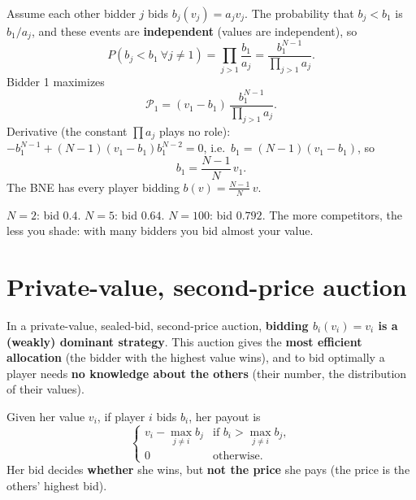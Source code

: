 \documentclass[11pt,a4paper,openany]{book}
\begin{document}
\begin{propbox}[title={$N$ bidders, values uniform on $[0,1]$}]
Assume each other bidder $j$ bids $b_j(v_j) = a_j v_j$. The probability that $b_j < b_1$ is
$b_1/a_j$, and these events are \textbf{independent} (values are independent), so
\[
P(b_j < b_1 \ \forall j \neq 1) = \prod_{j>1} \frac{b_1}{a_j}
  = \frac{b_1^{N-1}}{\prod_{j>1} a_j}.
\]
Bidder 1 maximizes
\[
\mathcal{P}_1 = (v_1 - b_1)\,\frac{b_1^{N-1}}{\prod_{j>1} a_j}.
\]
Derivative (the constant $\prod a_j$ plays no role):
$-b_1^{N-1} + (N-1)(v_1 - b_1) b_1^{N-2} = 0$, i.e.\ $b_1 = (N-1)(v_1 - b_1)$, so
\[
b_1 = \frac{N-1}{N}\, v_1.
\]
The BNE has every player bidding $b(v) = \frac{N-1}{N}\, v$.
\end{propbox}

\begin{exbox}[title={Numbers (not on the slides): value $v = 0.8$}]
$N = 2$: bid $0.4$. $N = 5$: bid $0.64$. $N = 100$: bid $0.792$. The more competitors, the
less you shade: with many bidders you bid almost your value.
\end{exbox}


\section{Private-value, second-price auction}

\begin{thmbox}[title=Truthful bidding is dominant]
In a private-value, sealed-bid, second-price auction, \textbf{bidding $b_i(v_i) = v_i$ is a
(weakly) dominant strategy}. This auction gives the \textbf{most efficient allocation} (the
bidder with the highest value wins), and to bid optimally a player needs \textbf{no knowledge
about the others} (their number, the distribution of their values).
\end{thmbox}

\begin{defnbox}[title=Payout]
Given her value $v_i$, if player $i$ bids $b_i$, her payout is
\[
\begin{cases}
v_i - \max_{j \neq i} b_j & \text{if } b_i > \max_{j \neq i} b_j, \\
0 & \text{otherwise.}
\end{cases}
\]
Her bid decides \textbf{whether} she wins, but \textbf{not the price} she pays (the price is
the others' highest bid).
\end{defnbox}
\end{document}
